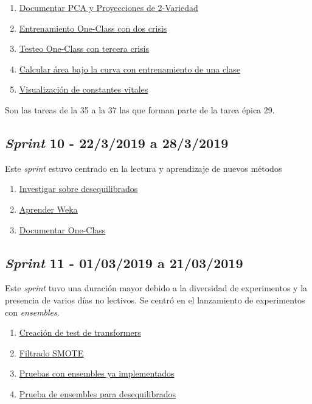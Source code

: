 \begin{enumerate}\addtocounter{enumi}{33}
	\item
	\href{https://github.com/joselucross/TFG-SmartBeds/issues/34}{Documentar PCA y Proyecciones de 2-Variedad}
	\item
	\href{https://github.com/joselucross/TFG-SmartBeds/issues/35}{Entrenamiento One-Class con dos crisis}
	\item
	\href{https://github.com/joselucross/TFG-SmartBeds/issues/36}{Testeo One-Class con tercera crisis}
	\item
	\href{https://github.com/joselucross/TFG-SmartBeds/issues/37}{Calcular área bajo la curva con entrenamiento de una clase}
	\item
	\href{https://github.com/joselucross/TFG-SmartBeds/issues/38}{Visualización de constantes vitales}
\end{enumerate}
Son las tareas de la 35 a la 37 las que forman parte de la tarea épica 29.
\subsection{\textit{Sprint} 10 - 22/3/2019 a 28/3/2019}
Este \textit{sprint} estuvo centrado en la lectura y aprendizaje de nuevos métodos

\begin{enumerate}\addtocounter{enumi}{38}
	\item
	\href{https://github.com/joselucross/TFG-SmartBeds/issues/39}{Investigar sobre desequilibrados}
	\item
	\href{https://github.com/joselucross/TFG-SmartBeds/issues/40}{Aprender Weka}
	\item
	\href{https://github.com/joselucross/TFG-SmartBeds/issues/41}{Documentar One-Class}
\end{enumerate}
\subsection{\textit{Sprint} 11 - 01/03/2019 a 21/03/2019}
Este \textit{sprint} tuvo una duración mayor debido a la diversidad de experimentos y la presencia de varios días no lectivos. Se centró en el lanzamiento de experimentos con \textit{ensembles}.
\begin{enumerate}\addtocounter{enumi}{41}
	\item
	\href{https://github.com/joselucross/TFG-SmartBeds/issues/42}{Creación de test de transformers}
	\item
	\href{https://github.com/joselucross/TFG-SmartBeds/issues/43}{Filtrado SMOTE}
	\item
	\href{https://github.com/joselucross/TFG-SmartBeds/issues/43}{Pruebas con ensembles ya implementados}
	\item
	\href{https://github.com/joselucross/TFG-SmartBeds/issues/45}{Prueba de ensembles para desequilibrados}
\end{enumerate}

